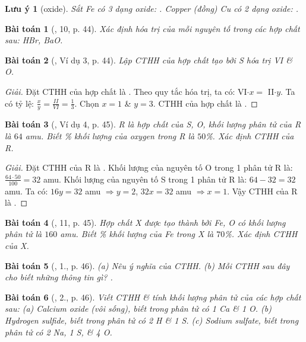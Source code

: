 \documentclass{article}
\newtheorem{baitoan}{Bài toán}
\newtheorem{luuy}{Lưu ý}
\begin{document}
\begin{luuy}[oxide]
	Sắt \emph{Fe} có 3 dạng oxide: \emph{}. Copper (đồng) \emph{Cu} có 2 dạng oxide: \emph{}.
\end{luuy}

\begin{baitoan}[\cite{SGK_KHTN_7_Canh_Dieu}, 10, p. 44]
	Xác định hóa trị của mỗi nguyên tố trong các hợp chất sau: \emph{HBr, BaO}.
\end{baitoan}

\begin{baitoan}[\cite{SGK_KHTN_7_Canh_Dieu}, Ví dụ 3, p. 44]
	Lập CTHH của hợp chất tạo bởi \emph{S} hóa trị VI \& \emph{O}.
\end{baitoan}

\begin{proof}[Giải]
	Đặt CTHH của hợp chất là . Theo quy tắc hóa trị, ta có: VI$\cdot x =$ II$\cdot y$. Ta có tỷ lệ: $\frac{x}{y} = \frac{II}{VI} = \frac{1}{3}$. Chọn $x = 1$ \& $y = 3$. CTHH của hợp chất là .
\end{proof}

\begin{baitoan}[\cite{SGK_KHTN_7_Canh_Dieu}, Ví dụ 4, p. 45]
	R là hợp chất của \emph{S, O}, khối lượng phân tử của R là $64$ amu. Biết \% khối lượng của oxygen trong R là $50$\%. Xác định CTHH của R.
\end{baitoan}

\begin{proof}[Giải]
	Đặt CTHH của R là . Khối lượng của nguyên tố O trong 1 phân tử R là: $\frac{64\cdot50}{100} = 32$ amu. Khối lượng của nguyên tố S trong 1 phân tử R là: $64 - 32 = 32$ amu. Ta có: $16y = 32$ amu $\Rightarrow y = 2$, $32x = 32$ amu $\Rightarrow x = 1$. Vậy CTHH của R là .
\end{proof}

\begin{baitoan}[\cite{SGK_KHTN_7_Canh_Dieu}, 11, p. 45]
	Hợp chất X được tạo thành bởi \emph{Fe, O} có khối lượng phân tử là $160$ amu. Biết \% khối lượng của \emph{Fe} trong X là $70$\%. Xác định CTHH của X.
\end{baitoan}

\begin{baitoan}[\cite{SGK_KHTN_7_Canh_Dieu}, 1., p. 46]
	(a) Nêu ý nghĩa của CTHH. (b) Mỗi CTHH sau đây cho biết những thông tin gì? \emph{}.
\end{baitoan}

\begin{baitoan}[\cite{SGK_KHTN_7_Canh_Dieu}, 2., p. 46]
	Viết CTHH \& tính khối lượng phân tử của các hợp chất sau: (a) Calcium oxide (vôi sống), biết trong phân tử có \emph{1 Ca \& 1 O}. (b) Hydrogen sulfide, biết trong phân tử có \emph{2 H \& 1 S}. (c) Sodium sulfate, biết trong phân tử có \emph{2 Na, 1 S, \& 4 O}.
\end{baitoan}
\end{document}
